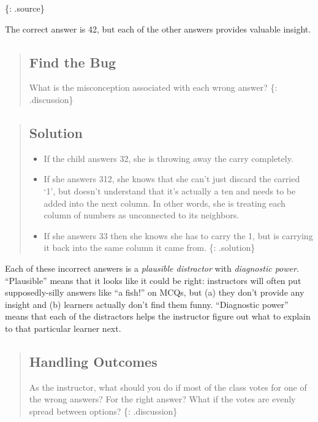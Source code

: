 \{: .source\}

The correct answer is 42, but each of the other answers provides
valuable insight.

\begin{quote}
\subsection{Find the Bug}\label{find-the-bug}

What is the misconception associated with each wrong answer? \{:
.discussion\}
\end{quote}

\begin{quote}
\subsection{Solution}\label{solution}

\begin{itemize}
\itemsep1pt\parskip0pt
\item
  If the child answers 32, she is throwing away the carry completely.
\item
  If she answers 312, she knows that she can't just discard the carried
  `1', but doesn't understand that it's actually a ten and needs to be
  added into the next column. In other words, she is treating each
  column of numbers as unconnected to its neighbors.
\item
  If she answers 33 then she knows she has to carry the 1, but is
  carrying it back into the same column it came from. \{: .solution\}
\end{itemize}
\end{quote}

Each of these incorrect answers is a \emph{plausible distractor} with
\emph{diagnostic power}. ``Plausible'' means that it looks like it could
be right: instructors will often put supposedly-silly answers like ``a
fish!'' on MCQs, but (a) they don't provide any insight and (b) learners
actually don't find them funny. ``Diagnostic power'' means that each of
the distractors helps the instructor figure out what to explain to that
particular learner next.

\begin{quote}
\subsection{Handling Outcomes}\label{handling-outcomes}

As the instructor, what should you do if most of the class votes for one
of the wrong answers? For the right answer? What if the votes are evenly
spread between options? \{: .discussion\}
\end{quote}

